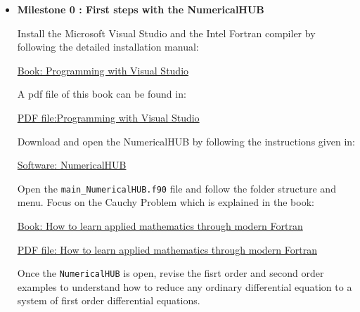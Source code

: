 \documentclass[12pt, a4paper]{article}
\begin{document}
\begin{itemize}
	
	
\vspace{1cm}
\item {\bf Milestone 0 : First steps with the NumericalHUB }



Install the Microsoft Visual Studio and the Intel Fortran compiler by following 
the detailed installation manual:   
  \color{red} 
 \begin{center} 
        \href{https://www.amazon.es/s?k=hernandez+rapado+moreno+visual&__mk_es_ES=AMAZON&ref=nb_sb_noss}
        {Book: Programming with 
          Visual Studio}
  \end{center} 
\color{black}

 
A pdf  file   of this book can be found in: 
\color{red} 
\begin{center}

  \href{https://github.com/jahrWork/Visual-Studio-projects}{PDF 
  file:Programming with 
  Visual Studio}

\end{center}
\color{black}



Download and open the NumericalHUB by following the instructions given in: 
\color{red} 
\begin{center}

  \href{https://github.com/jahrWork/NumericalHUB}{Software: NumericalHUB}

\end{center}
\color{black}                

Open the \texttt{main\_NumericalHUB.f90} file and follow the folder structure 
and menu. Focus on the Cauchy Problem which is explained in the book: 

\color{red} 
\begin{center}
  \href{https://www.amazon.es/s?k=modern+fortran+hernandez&__mk_es_ES=%C3%85M%C3%85%C5%BD%C3%95%C3%91&ref=nb_sb_noss}
  {Book: How to learn applied mathematics through modern Fortran}
  
   \href{https://github.com/jahrWork/NumericalHUB}
    {PDF file: How to learn applied mathematics through modern Fortran}
\end{center}
\color{black}
 
Once the \texttt{NumericalHUB} is open,  revise the fisrt order and second 
order examples to understand how to reduce any ordinary differential equation 
to a system of first order differential equations. 


\end{itemize}
\end{document}
